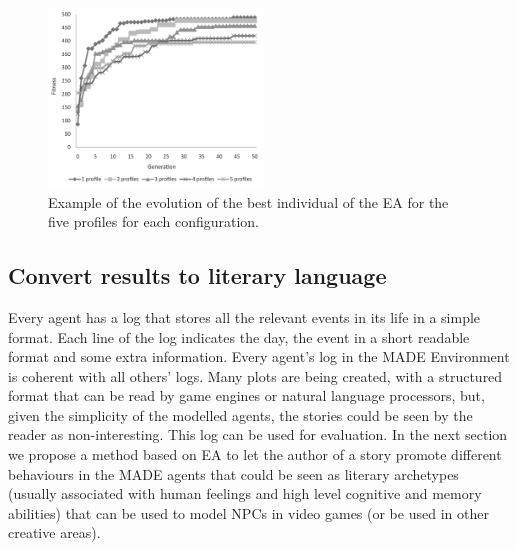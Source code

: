 \documentclass{sig-alternate}
\begin{document}
\begin{figure}[htb]
\centering

   \includegraphics[width=13.5pc] {img/graph2_v2.pdf}
\caption{Example of the evolution of the best individual of the EA for the five
  profiles for each configuration.}

\label{fig:boxplots}
\end{figure}

\subsection{Convert results to literary language}

Every agent has a log that stores all the relevant events in its life
in a simple format. Each line of the log indicates the day, the event
in a short readable format and some extra information. Every agent's
log in the MADE Environment is coherent with all others' logs. Many
plots are being created, with a structured format that can be read by
game engines or natural language processors, but, given the simplicity
of the modelled agents, the stories could be seen by the reader as
non-interesting. This log can be used for evaluation. In the next
section we propose a method based on EA to let the author of a story
promote different behaviours in the MADE agents that could be seen as
literary archetypes (usually associated with human feelings and high
level cognitive and memory abilities) that can be used to model NPCs
in video games (or be used in other creative areas). 
\end{document}
